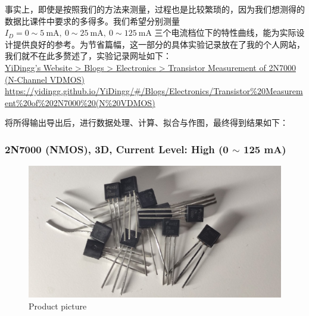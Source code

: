 \documentclass[UTF8]{article}
\begin{document}
事实上，即使是按照我们的方法来测量，过程也是比较繁琐的，因为我们想测得的数据比课件中要求的多得多。我们希望分别测量 $I_D = 0 \sim 5 \ \mathrm{mA},\ 0 \sim 25 \ \mathrm{mA},\ 0 \sim 125 \ \mathrm{mA}$ 三个电流档位下的特性曲线，能为实际设计提供良好的参考。为节省篇幅，这一部分的具体实验记录放在了我的个人网站，我们就不在此多赘述了，实验记录网址如下：\\ 
\href{https://yidingg.github.io/YiDingg/\#/Blogs/Electronics/Transistor\%20Measurement\%20of\%202N7000\%20(N\%20VDMOS)
}{ %
\hspace*{2em} YiDingg's Website > Blogs > Electronics > Transistor Measurement of 2N7000 (N-Channel VDMOS) 
\\ {\color{black}\small \hspace*{2em} https://yidingg.github.io/YiDingg/\#/Blogs/Electronics/Transistor\%20Measurement\%20of\%202N7000\%20(N\%20VDMOS)}
}

将所得输出导出后，进行数据处理、计算、拟合与作图，最终得到结果如下：

\subsubsection{2N7000 (NMOS), 3D, Current Level: High (0 $\sim$ 125 mA)}

\begin{figure}[H]\centering
    \includegraphics[width=0.6\columnwidth]{LCE-04-场效应管/assets/2N7000/2N7000 (NMOS) [onsemi, KH32] 3D current high/2N7000.png}
    \caption{Product picture}
\end{figure}
\end{document}
